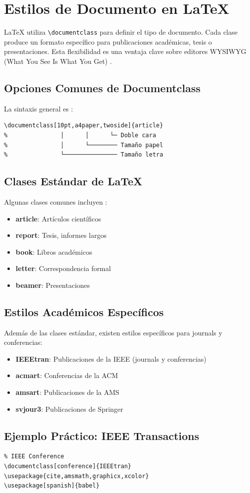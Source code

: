 \section{Estilos de Documento en LaTeX}

\LaTeX{} utiliza \texttt{\textbackslash documentclass} para definir el tipo de documento. Cada clase produce un formato específico para publicaciones académicas, tesis o presentaciones. Esta flexibilidad es una ventaja clave sobre editores WYSIWYG (What You See Is What You Get) \cite{latex_project}.

\subsection{Opciones Comunes de Documentclass}

La sintaxis general es \cite{latex_project}:

\begin{verbatim}
\documentclass[10pt,a4paper,twoside]{article}
%               │      │      └─ Doble cara
%               │      └──────── Tamaño papel
%               └─────────────── Tamaño letra
\end{verbatim}

\subsection{Clases Estándar de \LaTeX}

Algunas clases comunes incluyen \cite{latex_project}:

\begin{itemize}
  \item \textbf{article}: Artículos científicos
  \item \textbf{report}: Tesis, informes largos
  \item \textbf{book}: Libros académicos
  \item \textbf{letter}: Correspondencia formal
  \item \textbf{beamer}: Presentaciones
\end{itemize}

\subsection{Estilos Académicos Específicos}

Además de las clases estándar, existen estilos específicos para journals y conferencias:

\begin{itemize}
  \item \textbf{IEEEtran}: Publicaciones de la IEEE (journals y conferencias) \cite{ieeetran_doc}\
  \item \textbf{acmart}: Conferencias de la ACM \cite{acmart_class}
  \item \textbf{amsart}: Publicaciones de la AMS \cite{amslatex}
  \item \textbf{svjour3}: Publicaciones de Springer \cite{springer_svjour}
\end{itemize}

\subsection{Ejemplo Práctico: IEEE Transactions}

\begin{verbatim}
% IEEE Conference
\documentclass[conference]{IEEEtran}
\usepackage{cite,amsmath,graphicx,xcolor}
\usepackage[spanish]{babel}
\end{verbatim}